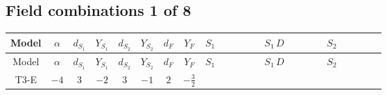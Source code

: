 \documentclass[8pt]{article}
\begin{document}
\begin{landscape}
\subsection*{Field combinations 1 of 8}
\begin{longtable}{@{}cccccccc >{\raggedright\arraybackslash}p{0.21\linewidth} >{\raggedright\arraybackslash}p{0.21\linewidth} >{\raggedright\arraybackslash}p{0.21\linewidth}@{}}
\toprule
Model & $\alpha$ & $d_{S_1}$ & $Y_{S_1}$ & $d_{S_2}$ & $Y_{S_2}$ & $d_F$ & $Y_F$ & $S_1$ & $S_1\,D$ & $S_2$ \\
\midrule
\endfirsthead
\toprule
Model & $\alpha$ & $d_{S_1}$ & $Y_{S_1}$ & $d_{S_2}$ & $Y_{S_2}$ & $d_F$ & $Y_F$ & $S_1$ & $S_1\,D$ & $S_2$ \\
\midrule
\endhead
T3-E & $-4$ & $3$ & $-2$ & $3$ & $-1$ & $2$ & $-\frac{3}{2}$ & \scriptsize\adjustbox{max width=\linewidth}{$\begin{gathered} +\frac{2 \hbar  \overline{y_{1,i_1,r_1}} \overline{y_{1,i_2,r_2}} S_{1,j_2}^2 y_{1,i_1,r_2} y_{1,i_2,r_1} \left(S_{1,j_1}{}^{\dagger }\right){}^2}{3 \epsilon } \\ -C_{S_1^\dagger S_1} S_{1,j_1} S_{1,j_1}{}^{\dagger } \\ +\frac{C_{S_1^\dagger S_1} \hbar  \overline{y_{1,i_1,r_1}} S_{1,j_1} y_{1,i_1,r_1} S_{1,j_1}{}^{\dagger }}{\sqrt{3}}\end{gathered}$} & \scriptsize\adjustbox{max width=\linewidth}{$\begin{gathered} +D_{\mu _1}\left(S_{1,j_1}\right){}^{\dagger } D_{\mu _1}\left(S_{1,j_1}\right)\end{gathered}$} & \scriptsize\adjustbox{max width=\linewidth}{$\begin{gathered} +\frac{2 \hbar  \overline{y_{2,i_1,r_1}} \overline{y_{2,i_2,r_2}} S_{2,j_2}^2 y_{2,i_1,r_2} y_{2,i_2,r_1} \left(S_{2,j_1}{}^{\dagger }\right){}^2}{3 \epsilon } \\ -C_{S_2^\dagger S_2} S_{2,j_1} S_{2,j_1}{}^{\dagger } \\ +\frac{C_{S_2^\dagger S_2} \hbar  \overline{y_{2,i_1,r_1}} S_{2,j_1} y_{2,i_1,r_1} S_{2,j_1}{}^{\dagger }}{\sqrt{3}}\end{gathered}$} \\

\end{longtable}
\end{landscape}
\end{document}
